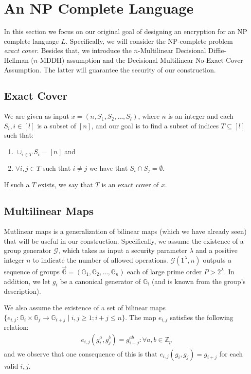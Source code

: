\newpage
\section{An  NP Complete Language }

In this section we focus on our original goal of designing an encryption for an NP complete language $L$. Specifically, we will consider the NP-complete problem \emph{exact cover}. Besides that, we introduce the $n$-Multilinear  Decisional Diffie-Hellman ($n$-MDDH) assumption  and the Decisional Multilinear No-Exact-Cover Assumption.  %
The latter will guarantee the security of our construction.

\subsection{ Exact Cover}

We are given as input $x = (n, S_1, S_2, \ldots, S_l)$, where $n$ is an integer and each $S_i, i \in [l]$ is a subset of $[n]$, and our goal is to find a subset of indices $T \subseteq [l]$ such that:

\begin{enumerate}
\item $\cup_{i \in T} S_i = [n] $ and

\item $\forall i, j \in T$ such that $i \ne j$ we have that $S_i \cap S_j = \emptyset$.
\end{enumerate}

If such a $T$ exists, we say that $T$ is an exact cover of $x$.

\subsection{Multilinear Maps}

Mutlinear maps is a generalization of bilinear maps (which we have already seen) that will be useful in our construction. Specifically, we assume the existence of a group generator $\mathcal{G}$, which takes as input a security parameter $\lambda$ and a positive integer $n$ to indicate the number of allowed operations. $\mathcal{G}(1^{\lambda},n)$ outputs a sequence of groups $\vec{\mathbb{G}}= (\mathbb{G}_1, \mathbb{G}_2, \ldots, \mathbb{G}_n)$  each of large prime order $P > 2^{\lambda}$. In addition, we let $g_i$ be a canonical generator of $\mathbb{G}_i$  (and is known from the group's description).

We also assume the existence of a set of bilinear maps $\{e_{i,j}: \mathbb{G}_i \times \mathbb{G}_j \rightarrow \mathbb{G}_{i+j} \mid i, j \ge 1; i+j \le n \}.$ The map $e_{i,j}$ satisfies the following relation:
\begin{align}
e_{i,j}\left(g_i^{a},g_j^{b}\right) = g^{ab}_{i+j}: \forall a,b \in \mathbb{Z}_p \label{vasikoni}
\end{align}
and we observe that one consequence of this is that $e_{i,j} (g_i, g_j) = g_{i+j}$ for each valid $i,j$.

